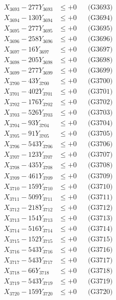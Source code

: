 \documentclass[a4paper,10pt]{article}
\begin{document}
{\begin{align}
X_{3693} - 277Y_{3693} &\leq +0 && \text{(G3693)} \\
X_{3694} - 130Y_{3694} &\leq +0 && \text{(G3694)} \\
X_{3695} - 277Y_{3695} &\leq +0 && \text{(G3695)} \\
X_{3696} - 258Y_{3696} &\leq +0 && \text{(G3696)} \\
X_{3697} - 16Y_{3697} &\leq +0 && \text{(G3697)} \\
X_{3698} - 205Y_{3698} &\leq +0 && \text{(G3698)} \\
X_{3699} - 277Y_{3699} &\leq +0 && \text{(G3699)} \\
X_{3700} - 43Y_{3700} &\leq +0 && \text{(G3700)} \\
\allowbreak
X_{3701} - 402Y_{3701} &\leq +0 && \text{(G3701)} \\
X_{3702} - 176Y_{3702} &\leq +0 && \text{(G3702)} \\
X_{3703} - 526Y_{3703} &\leq +0 && \text{(G3703)} \\
X_{3704} - 93Y_{3704} &\leq +0 && \text{(G3704)} \\
X_{3705} - 91Y_{3705} &\leq +0 && \text{(G3705)} \\
X_{3706} - 543Y_{3706} &\leq +0 && \text{(G3706)} \\
X_{3707} - 123Y_{3707} &\leq +0 && \text{(G3707)} \\
X_{3708} - 435Y_{3708} &\leq +0 && \text{(G3708)} \\
X_{3709} - 461Y_{3709} &\leq +0 && \text{(G3709)} \\
X_{3710} - 159Y_{3710} &\leq +0 && \text{(G3710)} \\
\allowbreak
X_{3711} - 509Y_{3711} &\leq +0 && \text{(G3711)} \\
X_{3712} - 218Y_{3712} &\leq +0 && \text{(G3712)} \\
X_{3713} - 154Y_{3713} &\leq +0 && \text{(G3713)} \\
X_{3714} - 516Y_{3714} &\leq +0 && \text{(G3714)} \\
X_{3715} - 152Y_{3715} &\leq +0 && \text{(G3715)} \\
X_{3716} - 543Y_{3716} &\leq +0 && \text{(G3716)} \\
X_{3717} - 543Y_{3717} &\leq +0 && \text{(G3717)} \\
X_{3718} - 66Y_{3718} &\leq +0 && \text{(G3718)} \\
X_{3719} - 543Y_{3719} &\leq +0 && \text{(G3719)} \\
X_{3720} - 159Y_{3720} &\leq +0 && \text{(G3720)} \\

\end{align}}
\end{document}
